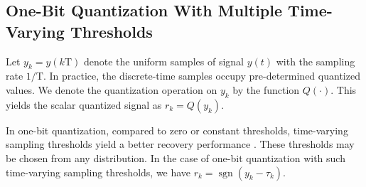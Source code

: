 \documentclass[12pt,draftcls,onecolumn]{IEEEtran}
\begin{document}
\subsection{One-Bit Quantization With Multiple Time-Varying Thresholds}
\label{one-bit}
Let $y_{k}=y(k\mathrm{T})$ denote the uniform samples of signal $y(t)$ with the sampling rate $1/\mathrm{T}$. %
In practice, the discrete-time samples occupy pre-determined quantized values. We denote the quantization operation on $y_{k}$ by the function $Q(\cdot)$. This yields the scalar quantized signal as $r_{k} = Q(y_{k})$.

In one-bit quantization, compared to zero or constant thresholds, time-varying sampling thresholds yield a better recovery performance \cite{ameri2018one,eamaz2023covariance}. These thresholds may be chosen from any distribution. 
In the case of one-bit quantization with such time-varying sampling thresholds, we have
$r_{k} = \operatorname{sgn}\left(y_{k}-\tau_{k}\right)$.
\end{document}
